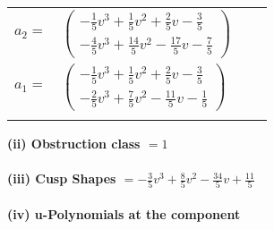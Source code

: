 \documentclass[1p]{elsarticle_modified}
\theoremstyle{definition}
\begin{document}
\begin{tabular}{m{7pt} m{180pt} m{7pt} m{180pt} }
\flushright $a_{2}=$&$\begin{pmatrix}-\frac{1}{5} v^3+\frac{1}{5} v^2+\frac{2}{5} v-\frac{3}{5}\\-\frac{4}{5} v^3+\frac{14}{5} v^2-\frac{17}{5} v-\frac{7}{5}\end{pmatrix}$ \\
\flushright $a_{1}=$&$\begin{pmatrix}-\frac{1}{5} v^3+\frac{1}{5} v^2+\frac{2}{5} v-\frac{3}{5}\\-\frac{2}{5} v^3+\frac{7}{5} v^2-\frac{11}{5} v-\frac{1}{5}\end{pmatrix}$\\&\end{tabular}
\flushleft \textbf{(ii) Obstruction class $= 1$}\\~\\
\flushleft \textbf{(iii) Cusp Shapes $= -\frac{3}{5} v^3+\frac{8}{5} v^2-\frac{34}{5} v+\frac{11}{5}$}\\~\\
\newpage\renewcommand{\arraystretch}{1}
\flushleft \textbf{(iv) u-Polynomials at the component}\newline \\
\end{document}
